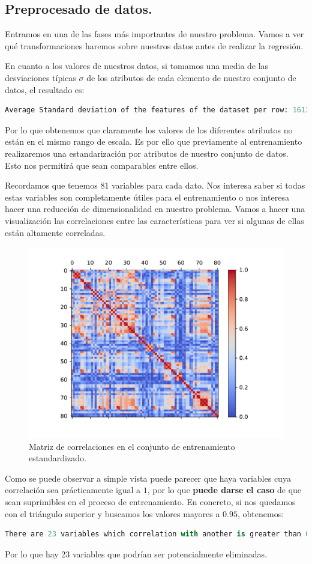 \documentclass[a4paper, 20pt]{article}
\begin{document}
\subsection{Preprocesado de datos.}

Entramos en una de las fases más importantes de nuestro problema. Vamos a ver qué transformaciones haremos sobre nuestros datos antes de realizar la regresión.


En cuanto a los valores de nuestros datos, si tomamos una media de las desviaciones típicas $\sigma$ de los atributos de cada elemento de nuestro conjunto de datos, el resultado es:
\begin{lstlisting}[language = Python]
  Average Standard deviation of the features of the dataset per row: 1613.81306
\end{lstlisting}
Por lo que obtenemos que claramente los valores de los diferentes atributos no están en el mismo rango de escala. Es por ello que previamente al entrenamiento realizaremos una estandarización por atributos de nuestro conjunto de datos. Esto nos permitirá que sean comparables entre ellos.

Recordamos que tenemos 81 variables para cada dato. Nos interesa saber si todas estas variables son completamente útiles para el entrenamiento o nos interesa hacer una reducción de dimensionalidad en nuestro problema. Vamos a hacer una visualización las correlaciones entre las características para ver si algunas de ellas están altamente correladas.

\begin{figure}[H]
  \centering
  \includegraphics[width=0.55\linewidth]{media/corr-normalized.pdf}
  \caption{Matriz de correlaciones en el conjunto de entrenamiento estandardizado. }
  \label{fig:myfig:2}
\end{figure}

Como se puede observar a simple vista puede parecer que haya variables cuya correlación sea prácticamente igual a $1$, por lo que \textbf{puede darse el caso} de que sean suprimibles en el proceso de entrenamiento. En concreto, si nos quedamos con el triángulo superior y buscamos los valores mayores a $0.95$, obtenemos:
\begin{lstlisting}[language = Python]
  There are 23 variables which correlation with another is greater than 0.95
\end{lstlisting}
Por lo que hay 23 variables que podrían ser potencialmente eliminadas. 
\end{document}
